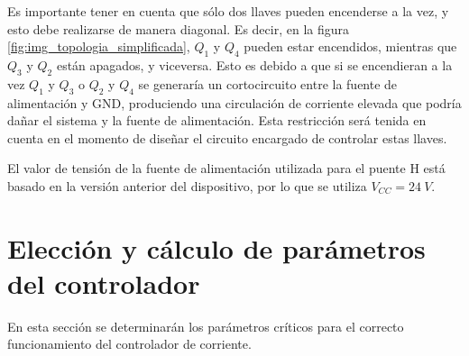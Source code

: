 Es importante tener en cuenta que sólo dos llaves pueden encenderse a la vez, y esto debe realizarse de manera diagonal. Es decir, en la figura \ref{fig:img_topologia_simplificada}, $Q_1$ y $Q_4$ pueden estar encendidos, mientras que $Q_3$ y $Q_2$ están apagados, y viceversa. Esto es debido a que si se encendieran a la vez  $Q_1$ y $Q_3$ o  $Q_2$ y $Q_4$ se generaría un cortocircuito entre la fuente de alimentación y GND, produciendo una circulación de corriente elevada que podría dañar el sistema y la fuente de alimentación. Esta restricción será tenida en cuenta en el momento de diseñar el circuito encargado de controlar estas llaves.

El valor de tensión de la fuente de alimentación utilizada para el puente H está basado en la versión anterior del dispositivo, por lo que se utiliza $V_{CC} = 24\:V$.

\section{Elección y cálculo de parámetros del controlador}

En esta sección se determinarán los parámetros críticos para el correcto funcionamiento del controlador de corriente.




